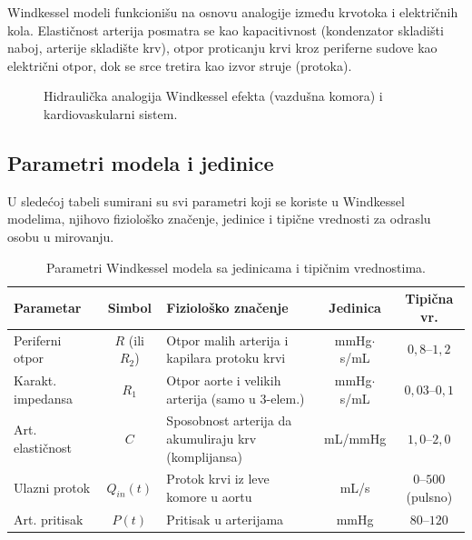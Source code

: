 \documentclass[12pt,a4paper]{article}
\begin{document}
Windkessel modeli funkcionišu na osnovu analogije između krvotoka i električnih kola. Elastičnost arterija posmatra se kao kapacitivnost (kondenzator skladišti naboj, arterije skladište krv), otpor proticanju krvi kroz periferne sudove kao električni otpor, dok se srce tretira kao izvor struje (protoka).

\begin{figure}[H]
    \centering
    \caption{Hidraulička analogija Windkessel efekta (vazdušna komora) i kardiovaskularni sistem.}
    \label{fig:windkessel}
\end{figure}

\subsection{Parametri modela i jedinice}

U sledećoj tabeli sumirani su svi parametri koji se koriste u Windkessel modelima, njihovo fiziološko značenje, jedinice i tipične vrednosti za odraslu osobu u mirovanju.

\begin{table}[H]
\centering
\caption{Parametri Windkessel modela sa jedinicama i tipičnim vrednostima.}
\label{tab:parametri}
\renewcommand{\arraystretch}{1.4}
\begin{tabular}{>{\raggedright}p{3cm} c >{\raggedright}p{4cm} c c}
\toprule
\textbf{Parametar} & \textbf{Simbol} & \textbf{Fiziološko značenje} & \textbf{Jedinica} & \textbf{Tipična vr.} \\
\midrule
Periferni otpor & $R$ (ili $R_2$) & Otpor malih arterija i kapilara protoku krvi & mmHg$\cdot$s/mL & $0{,}8$--$1{,}2$ \\
Karakt. impedansa & $R_1$ & Otpor aorte i velikih arterija (samo u 3-elem.) & mmHg$\cdot$s/mL & $0{,}03$--$0{,}1$ \\
Art. elastičnost & $C$ & Sposobnost arterija da akumuliraju krv (komplijansa) & mL/mmHg & $1{,}0$--$2{,}0$ \\
Ulazni protok & $Q_{in}(t)$ & Protok krvi iz leve komore u aortu & mL/s & $0$--$500$ (pulsno) \\
Art. pritisak & $P(t)$ & Pritisak u arterijama & mmHg & $80$--$120$ \\
\bottomrule
\end{tabular}
\end{table}
\end{document}
